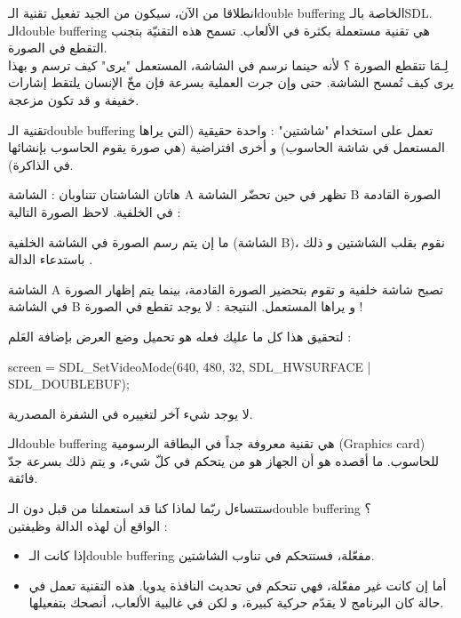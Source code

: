 انطلاقا من الآن، سيكون من الجيد تفعيل تقنية الـ\textenglish{double buffering}
الخاصة بالـ\textenglish{SDL}.
الـ\textenglish{double buffering}
هي تقنية مستعملة بكثرة في الألعاب. تسمح هذه التقنيّة بتجنب التقطع في الصورة.\\
لِـمَا تتقطع الصورة ؟ لأنه حينما نرسم في الشاشة، المستعمل "يرى" كيف ترسم و بهذا يرى كيف تُمسح الشاشة. حتى وإن جرت العملية بسرعة فإن مخّ الإنسان يلتقط إشارات خفيفة و قد تكون مزعجة.

تقنية الـ\textenglish{double buffering}
تعمل على استخدام "شاشتين" : واحدة حقيقية (التي يراها المستعمل في شاشة الحاسوب) و أخرى افتراضية (هي صورة يقوم الحاسوب بإنشائها في الذاكرة).

هاتان الشاشتان تتناوبان : الشاشة
\textenglish{A}
تظهر في حين تحضّر الشاشة
\textenglish{B}
الصورة القادمة في  الخلفية. لاحظ الصورة التالية :


ما إن يتم رسم الصورة في الشاشة الخلفية (الشاشة 
\textenglish{B})،
نقوم بقلب الشاشتين و ذلك باستدعاء الدالة
.


الشاشة
\textenglish{A}
تصبح شاشة خلفية و تقوم بتحضير الصورة القادمة، بينما يتم إظهار الصورة في الشاشة
\textenglish{B}
و يراها المستعمل. النتيجة : لا يوجد تقطع في الصورة !

لتحقيق هذا كل ما عليك فعله هو تحميل وضع العرض بإضافة العَلم 
 :

\begin{Csource}
screen = SDL_SetVideoMode(640, 480, 32, SDL_HWSURFACE | SDL_DOUBLEBUF);
\end{Csource}

لا يوجد شيء آخر لتغييره في الشفرة المصدرية.

\begin{information}
 الـ\textenglish{double buffering}
هي تقنية معروفة جداً في البطاقة الرسومية
(\textenglish{Graphics card})
 للحاسوب. ما أقصده هو أن الجهاز هو من يتحكم في كلّ شيء، و يتم ذلك بسرعة جدّ فائقة.
\end{information}

ستتساءل ربّما لماذا كنا قد استعملنا
من قبل دون الـ\textenglish{double buffering} ؟\\
الواقع أن لهذه الدالة وظيفتين :

\begin{itemize}
	\item إذا كانت الـ\textenglish{double buffering}
	مفعّلة، فستتحكم في تناوب الشاشتين.
	\item أما إن كانت غير مفعّلة، فهي تتحكم في تحديث النافذة يدويا. هذه التقنية تعمل في حالة كان البرنامج لا يقدّم حركية كبيرة، و لكن في غالبية الألعاب، أنصحك بتفعيلها.
\end{itemize}

